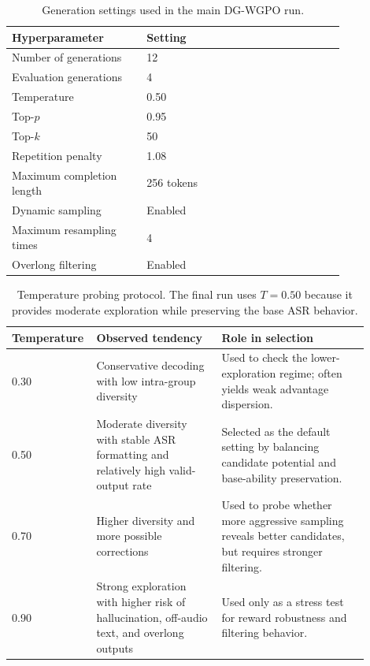 \documentclass{llmxive}
\begin{document}
\begin{table}[t]
\centering
\small
\begin{tabular}{p{0.34\linewidth} p{0.50\linewidth}}
\toprule
\textbf{Hyperparameter} & \textbf{Setting} \\
\midrule
Number of generations
& 12 \\

Evaluation generations
& 4 \\

Temperature
& 0.50 \\

Top-$p$
& 0.95 \\

Top-$k$
& 50 \\

Repetition penalty
& 1.08 \\

Maximum completion length
& 256 tokens \\

Dynamic sampling
& Enabled \\

Maximum resampling times
& 4 \\

Overlong filtering
& Enabled \\
\bottomrule
\end{tabular}
\vspace{-2mm}
\caption{
Generation settings used in the main DG-WGPO run.
}
\label{tab:dg_wgpo_generation_hparams}
\end{table}

\begin{table}[t]
\centering
\small
\begin{tabular}{p{0.16\linewidth} p{0.34\linewidth} p{0.40\linewidth}}
\toprule
\textbf{Temperature} & \textbf{Observed tendency} & \textbf{Role in selection} \\
\midrule
0.30
& Conservative decoding with low intra-group diversity
& Used to check the lower-exploration regime; often yields weak advantage
dispersion. \\

0.50
& Moderate diversity with stable ASR formatting and relatively high valid-output
rate
& Selected as the default setting by balancing candidate potential and
base-ability preservation. \\

0.70
& Higher diversity and more possible corrections
& Used to probe whether more aggressive sampling reveals better candidates, but
requires stronger filtering. \\

0.90
& Strong exploration with higher risk of hallucination, off-audio text, and
overlong outputs
& Used only as a stress test for reward robustness and filtering behavior. \\
\bottomrule
\end{tabular}
\vspace{-2mm}
\caption{
Temperature probing protocol. The final run uses $T=0.50$ because it provides
moderate exploration while preserving the base ASR behavior.
}
\label{tab:dg_wgpo_temperature_probe}
\end{table}
\end{document}
